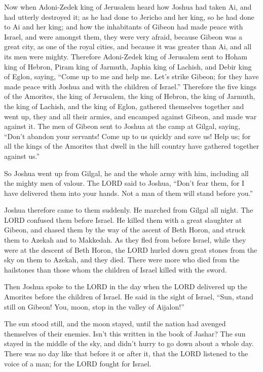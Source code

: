 Now when Adoni-Zedek king of Jerusalem heard how Joshua had
taken Ai, and had utterly destroyed it; as he had done to Jericho and
her king, so he had done to Ai and her king; and how the inhabitants of
Gibeon had made peace with Israel, and were amongst them, 
they were very afraid, because Gibeon was a great city, as one of the
royal cities, and because it was greater than Ai, and all its men were
mighty.  Therefore Adoni-Zedek king of Jerusalem sent to
Hoham king of Hebron, Piram king of Jarmuth, Japhia king of Lachish, and
Debir king of Eglon, saying,  ``Come up to me and help me.
Let's strike Gibeon; for they have made peace with Joshua and with the
children of Israel.''  Therefore the five kings of the
Amorites, the king of Jerusalem, the king of Hebron, the king of
Jarmuth, the king of Lachish, and the king of Eglon, gathered themselves
together and went up, they and all their armies, and encamped against
Gibeon, and made war against it.  The men of Gibeon sent to
Joshua at the camp at Gilgal, saying, ``Don't abandon your servants!
Come up to us quickly and save us! Help us; for all the kings of the
Amorites that dwell in the hill country have gathered together against
us.''

 So Joshua went up from Gilgal, he and the whole army with
him, including all the mighty men of valour.  The LORD said
to Joshua, ``Don't fear them, for I have delivered them into your hands.
Not a man of them will stand before you.''

 Joshua therefore came to them suddenly. He marched from
Gilgal all night.  The LORD confused them before Israel. He
killed them with a great slaughter at Gibeon, and chased them by the way
of the ascent of Beth Horon, and struck them to Azekah and to Makkedah.
 As they fled from before Israel, while they were at the
descent of Beth Horon, the LORD hurled down great stones from the sky on
them to Azekah, and they died. There were more who died from the
hailstones than those whom the children of Israel killed with the sword.

 Then Joshua spoke to the LORD in the day when the LORD
delivered up the Amorites before the children of Israel. He said in the
sight of Israel, ``Sun, stand still on Gibeon! You, moon, stop in the
valley of Aijalon!''

 The sun stood still, and the moon stayed, until the nation
had avenged themselves of their enemies. Isn't this written in the book
of Jashar? The sun stayed in the middle of the sky, and didn't hurry to
go down about a whole day.  There was no day like that
before it or after it, that the LORD listened to the voice of a man; for
the LORD fought for Israel.

